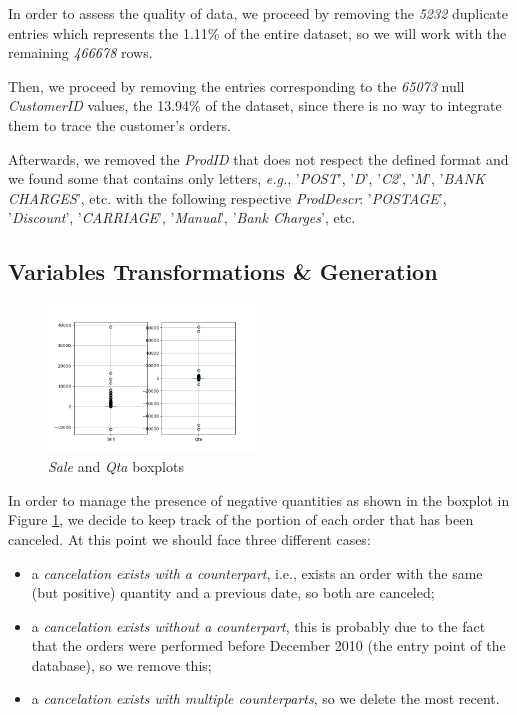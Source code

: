In order to assess the quality of data, we proceed by removing the \emph{5232} duplicate entries which represents the 1.11\% of the entire dataset, so we will work with the remaining \emph{466678} rows.

Then, we proceed by removing the entries corresponding to the \emph{65073} null \emph{CustomerID} values, the 13.94\% of the dataset, since there is no way to integrate them to trace the customer's orders.

Afterwards, we removed the \emph{ProdID} that does not respect the defined format and we found some that contains only letters, \emph{e.g.}, '\emph{POST}', '\emph{D}', '\emph{C2}', '\emph{M}', '\emph{BANK CHARGES}', etc. with the following respective \emph{ProdDescr}: '\emph{POSTAGE}', '\emph{Discount}', '\emph{CARRIAGE}', '\emph{Manual}', '\emph{Bank Charges}', etc.

\subsection{Variables Transformations \& Generation}

\begin{figure}
\centering
\includegraphics[width=0.49\textwidth]{img/boxplot_before.png}
\caption{\emph{Sale} and \emph{Qta} boxplots}
\label{fig:original_sale_qta_boxplots}
\end{figure}

In order to manage the presence of negative quantities as shown in the boxplot in Figure \ref{fig:original_sale_qta_boxplots}, we decide to keep track of the portion of each order that has been canceled. At this point we should face three different cases:

\begin{itemize}
\item a \emph{cancelation exists with a counterpart}, i.e., exists an order with the same (but positive) quantity and a previous date, so both are canceled;
\item a \emph{cancelation exists without a counterpart}, this is probably due to the fact that the orders were performed before December 2010 (the entry point of the database), so we remove this;
\item a \emph{cancelation exists with multiple counterparts}, so we delete the most recent.
\end{itemize}

